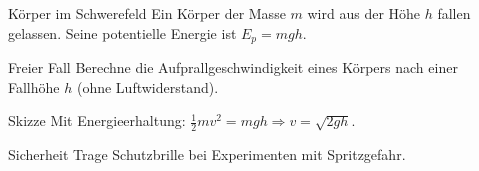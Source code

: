 \documentclass[11pt,a4paper,oneside]{article}
\begin{document}
	\begin{exem}{Körper im Schwerefeld}
		Ein Körper der Masse $m$ wird aus der Höhe $h$ fallen gelassen. Seine potentielle Energie ist $E_p = mgh$.
	\end{exem}
	
	\begin{aufgabe}{Freier Fall}
		Berechne die Aufprallgeschwindigkeit eines Körpers nach einer Fallhöhe $h$ (ohne Luftwiderstand).
	\end{aufgabe}
	
	\begin{loesung}{Skizze}
		Mit Energieerhaltung: $\frac12 mv^2 = mgh \Rightarrow v=\sqrt{2gh}$.
	\end{loesung}
	
	\begin{infobox}{Sicherheit}
		Trage Schutzbrille bei Experimenten mit Spritzgefahr.
	\end{infobox}
	
\end{document}
